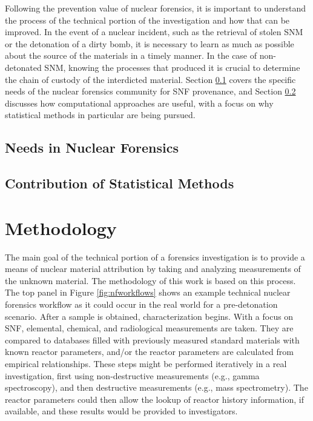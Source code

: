 Following the prevention value of nuclear forensics, it is important to
understand the process of the technical portion of the investigation and how
that can be improved.  In the event of a nuclear incident, such as the
retrieval of stolen \gls{SNM} or the detonation of a dirty bomb,
it is necessary to learn as much as possible about the source of the materials
in a timely manner. In the case of non-detonated \gls{SNM}, knowing the
processes that produced it is crucial to determine the chain of custody of the
interdicted material.  Section \ref{sec:nfneeds} covers the specific needs of
the nuclear forensics community for \gls{SNF} provenance, and Section
\ref{sec:statscontrib} discusses how computational approaches are useful, with
a focus on why statistical methods in particular are being pursued. 

\subsection{Needs in Nuclear Forensics}

\label{sec:nfneeds}

\subsection{Contribution of Statistical Methods}

\label{sec:statscontrib}

\section{Methodology}
\label{sec:methodology}

The main goal of the technical portion of a forensics investigation is to
provide a means of nuclear material attribution by taking and analyzing
measurements of the unknown material.  The methodology of this work is based on
this process. The top panel in Figure \ref{fig:nfworkflows} shows an example
technical nuclear forensics workflow as it could occur in the real world for a
pre-detonation scenario.  After a sample is obtained, characterization begins.
With a focus on \gls{SNF}, elemental, chemical, and radiological measurements
are taken.  They are compared to databases filled with previously measured
standard materials with known reactor parameters, and/or the reactor parameters
are calculated from empirical relationships.  These steps might be performed
iteratively in a real investigation, first using non-destructive measurements
(e.g., gamma spectroscopy), and then destructive measurements (e.g., mass
spectrometry).  The reactor parameters could then allow the lookup of reactor
history information, if available, and these results would be provided to
investigators. 

